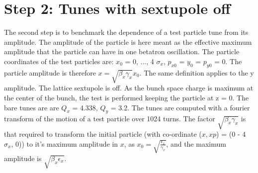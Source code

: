 \documentclass[a4paper]{cernatsnote}
\begin{document}
\section{Step 2: Tunes with sextupole off}

The second step is to benchmark the dependence of a test particle tune from its amplitude. The amplitude of the particle is here meant as the effective maximum amplitude that the particle can have in one betatron oscillation. The particle coordinates of the test particles are: $x_0$ = 0, ..., 4 $\sigma_x$, $p_{x0}$ = $y_0$ = $p_{y0}$ = 0. The particle amplitude is therefore $x = \sqrt{\beta_x \gamma_x} x_0$. The same definition applies to the y amplitude. The lattice sextupole is off. As the bunch space charge is maximum at the center of the bunch, the test is performed keeping the particle at z = 0. The bare tunes are are $Q_x$ = 4.338, $Q_y$ = 3.2. The tunes are computed with a fourier transform of the motion of a test particle over 1024 turns. 
The factor $\sqrt{\beta_x \gamma_x}$ is that required to transform the initial particle (with co-ordinate ($x,xp$) = (0 - 4 $\sigma_x$, 0)) to it's maximum amplitude in $x$, as $x_0 = \sqrt{\frac{\epsilon_x}{\gamma_x}}$, and the maximum amplitude is $\sqrt{\beta_x \epsilon_x}$.
\end{document}
